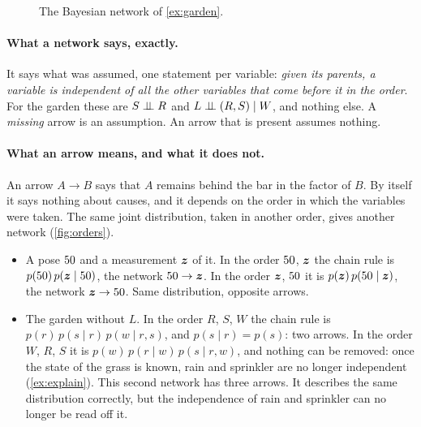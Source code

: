 \begin{figure}[ht]
\centering
{}
\caption{The Bayesian network of \cref{ex:garden}.}
\label{fig:garden}
\end{figure}

\paragraph{What a network says, exactly.} It says what was assumed, one
statement per variable: \emph{given its parents, a variable is independent
of all the other variables that come before it in the order}. For the
garden these are $S\mathrel{\perp\!\!\!\perp} R$ and $L\mathrel{\perp\!\!\!\perp}(R,S)\mid W$, and nothing else. A
\emph{missing} arrow is an assumption. An arrow that is present assumes
nothing.

\paragraph{What an arrow means, and what it does not.} An arrow
$A\rightarrow B$ says that $A$ remains behind the bar in the factor of
$B$. By itself it says nothing about causes, and it depends on the order
in which the variables were taken. The same joint distribution, taken in
another order, gives another network (\cref{fig:orders}).
\begin{itemize}[nosep]
  \item A pose $50$ and a measurement $\bm{z}$ of it. In the order $50$, $\bm{z}$
    the chain rule is $p(50)\,p(\bm{z}\mid50)$, the network
    $50\rightarrow\bm{z}$. In the order $\bm{z}$, $50$ it is
    $p(\bm{z})\,p(50\mid\bm{z})$, the network $\bm{z}\rightarrow50$. Same
    distribution, opposite arrows.
  \item The garden without $L$. In the order $R$, $S$, $W$ the chain rule
    is $p(r)\,p(s\mid r)\,p(w\mid r,s)$, and $p(s\mid r)=p(s)$: two
    arrows. In the order $W$, $R$, $S$ it is
    $p(w)\,p(r\mid w)\,p(s\mid r,w)$, and nothing can be removed: once the
    state of the grass is known, rain and sprinkler are no longer
    independent (\cref{ex:explain}). This second network has three arrows.
    It describes the same distribution correctly, but the independence of
    rain and sprinkler can no longer be read off it.
\end{itemize}

